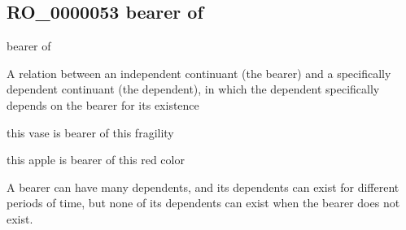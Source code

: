 \documentclass[letterpaper,10pt,english]{sphinxmanual}
\begin{document}
\subsection{RO\_0000053 \sphinxhyphen{} bearer of}
\label{\detokenize{doc-RO_0000053:ro-0000053-bearer-of}}\label{\detokenize{doc-RO_0000053:index-0}}\label{\detokenize{doc-RO_0000053::doc}}
\begin{sphinxShadowBox}

\sphinxAtStartPar
bearer of
\end{sphinxShadowBox}

\begin{sphinxShadowBox}

\sphinxAtStartPar
{}
\end{sphinxShadowBox}

\begin{sphinxShadowBox}

\sphinxAtStartPar
A relation between an independent continuant (the bearer) and a specifically dependent continuant (the dependent), in which the dependent specifically depends on the bearer for its existence
\end{sphinxShadowBox}

\begin{sphinxShadowBox}

\sphinxAtStartPar
this vase is bearer of this fragility

\sphinxAtStartPar
this apple is bearer of this red color
\end{sphinxShadowBox}

\begin{sphinxShadowBox}

\sphinxAtStartPar
A bearer can have many dependents, and its dependents can exist for different periods of time, but none of its dependents can exist when the bearer does not exist.
\end{sphinxShadowBox}

\begin{sphinxShadowBox}

\sphinxAtStartPar
{}
\end{sphinxShadowBox}
\begin{quote}

\ignorespaces \end{quote}
\end{document}
